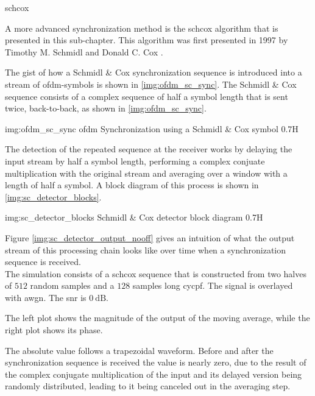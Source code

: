 \begin{subchapter}{\acrlong{schcox}}
  \label{chap:intr_scsync}

  A more advanced synchronization method is
  the \acrlong{schcox} algorithm that is presented
  in this sub-chapter. 
  This algorithm was first presented in 1997 by
  Timothy M. Schmidl and Donald C. Cox \cite{schmidlcox}.
  
  The gist of how a Schmidl \& Cox synchronization sequence
  is introduced into a stream of \gls{ofdm}-symbols is
  shown in \autoref{img:ofdm_sc_sync}.
  The Schmidl \& Cox sequence consists of a complex sequence
  of half a symbol length that is sent twice, back-to-back,
  as shown in \autoref{img:ofdm_sc_sync}.

               {img:ofdm_sc_sync}
               {\acrshort{ofdm} Synchronization using a Schmidl \& Cox symbol}
               {0.7}{H}

  The detection of the repeated sequence at the receiver works by delaying
  the input stream by half a symbol length, performing a complex conjuate
  multiplication with the original stream and averaging over a window with
  a length of half a symbol.
  A block diagram of this process is shown in \autoref{img:sc_detector_blocks}.

               {img:sc_detector_blocks}
               {Schmidl \& Cox detector block diagram}
               {0.7}{H}

  Figure \ref{img:sc_detector_output_nooff} gives an intuition
  of what the output stream of this processing chain looks like
  over time when a synchronization sequence is received. \\

  The simulation consists of a \gls{schcox} sequence
  that is constructed from two halves of $512$ random samples
  and a $128$ samples long \acrlong{cycpf}.
  The signal is overlayed with \acrlong{awgn}.
  The \gls{snr} is $\SI{0}{\deci\bel}$.

  The left plot shows the magnitude of the output of
  the moving average, while the right plot shows its phase.

  The absolute value follows a trapezoidal waveform.
  Before and after the synchronization sequence is received
  the value is nearly zero, due to the result of the complex
  conjugate multiplication of the input and its delayed version
  being randomly distributed, leading to it being canceled out
  in the averaging step.


\end{subchapter}
